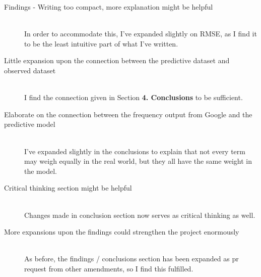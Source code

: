 \documentclass[11pt]{report} %
\begin{document}
\begin{description}
\item[Findings - Writing too compact, more explanation might be helpful]\hfill\\{
In order to accommodate this, I've expanded slightly on RMSE, as I find it to be the least intuitive part of what I've written.}
\item[Little expansion upon the connection between the predictive dataset and observed dataset]\hfill\\{I find the connection given in Section \textbf{4. Conclusions} to be sufficient.}
\item[Elaborate on the connection between the frequency output from Google and the predictive model]\hfill\\{I've expanded slightly in the conclusions to explain that not every term may weigh equally in the real world, but they all have the same weight in the model.}
\item[Critical thinking section might be helpful]\hfill\\{Changes made in conclusion section now serves as critical thinking as well.}
\item[More expansions upon the findings could strengthen the project enormously]\hfill\\{As before, the findings / conclusions section has been expanded as pr request from other amendments, so I find this fulfilled.}
\end{description}
\newpage






\end{document}
